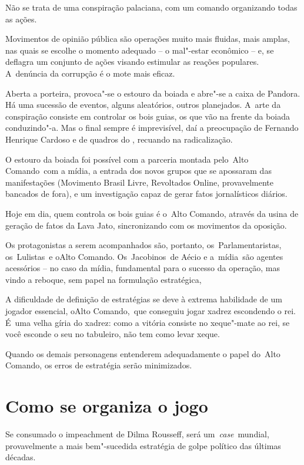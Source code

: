 Não se trata de uma conspiração palaciana, com um comando organizando
todas as ações.

Movimentos de opinião pública são operações muito mais fluidas, mais
amplas, nas quais se escolhe o momento adequado -- o mal"-estar econômico
-- e, se deflagra um conjunto de ações visando estimular as reações
populares. A~denúncia da corrupção é o mote mais eficaz.

Aberta a porteira, provoca"-se o estouro da boiada e abre"-se a caixa de
Pandora. Há uma sucessão de eventos, alguns aleatórios, outros
planejados. A~arte da conspiração consiste em controlar os bois guias,
os que vão na frente da boiada conduzindo"-a. Mas o final sempre é
imprevisível, daí a preocupação de Fernando Henrique Cardoso e de
quadros do , recuando na radicalização.

O estouro da boiada foi possível com a parceria montada pelo~Alto
Comando~com a mídia, a entrada dos novos grupos que se apossaram das
manifestações (Movimento Brasil Livre, Revoltados Online, provavelmente
bancados de fora), e um investigação capaz de gerar fatos jornalísticos
diários.

Hoje em dia, quem controla os bois guias é o~Alto Comando, através da
usina de geração de fatos da Lava Jato, sincronizando com os movimentos
da oposição.

Os protagonistas a serem acompanhados são, portanto,
os~Parlamentaristas, os~Lulistas~e oAlto Comando. Os~Jacobinos~de Aécio
e a~mídia~são agentes acessórios -- no caso da mídia, fundamental para o
sucesso da operação, mas vindo a reboque, sem papel na formulação
estratégica,

A dificuldade de definição de estratégias se deve à extrema habilidade
de um jogador essencial, oAlto Comando,~que conseguiu jogar xadrez
escondendo o rei. É~uma velha gíria do xadrez: como a vitória consiste
no xeque"-mate ao rei, se você esconde o seu no tabuleiro, não tem como
levar xeque.

Quando os demais personagens entenderem adequadamente o papel do~Alto
Comando, os erros de estratégia serão minimizados.

\section{Como se organiza o jogo}

Se consumado o impeachment de Dilma Rousseff, será
um~\emph{case}~mundial, provavelmente a mais bem"-sucedida estratégia de
golpe político das últimas décadas.

